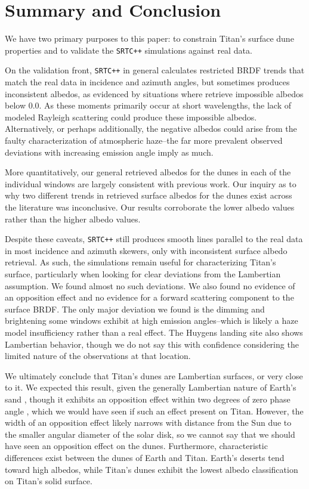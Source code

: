 \documentclass[twocolumn,linenumbers]{aastex631}
\def\srtcppspace{{\tt SRTC++} }
\begin{document}
\section{Summary and Conclusion} \label{sec:conclusion}

We have two primary purposes to this paper: to constrain Titan's surface dune properties and to validate the \srtcppspace simulations against real data.

On the validation front, \srtcppspace in general calculates restricted BRDF trends that match the real data in incidence and azimuth angles, but sometimes produces inconsistent albedos, as evidenced by situations where retrieve impossible albedos below 0.0. As these moments primarily occur at short wavelengths, the lack of modeled Rayleigh scattering could produce these impossible albedos. Alternatively, or perhaps additionally, the negative albedos could arise from the faulty characterization of atmospheric haze--the far more prevalent observed deviations with increasing emission angle imply as much.

More quantitatively, our general retrieved albedos for the dunes in each of the individual windows are largely consistent with previous work. Our inquiry as to why two different trends in retrieved surface albedos for the dunes exist across the literature was inconclusive. Our results corroborate the lower albedo values rather than the higher albedo values.

Despite these caveats, \srtcppspace still produces smooth lines parallel to the real data in most incidence and azimuth skewers, only with inconsistent surface albedo retrieval. As such, the simulations remain useful for characterizing Titan's surface, particularly when looking for clear deviations from the Lambertian assumption. We found almost no such deviations. We also found no evidence of an opposition effect and no evidence for a forward scattering component to the surface BRDF. The only major deviation we found is the dimming and brightening some windows exhibit at high emission angles--which is likely a haze model insufficiency rather than a real effect. The Huygens landing site also shows Lambertian behavior, though we do not say this with confidence considering the limited nature of the observations at that location.

We ultimately conclude that Titan's dunes are Lambertian surfaces, or very close to it. We expected this result, given the generally Lambertian nature of Earth's sand \citep{Hapke1963}, though it exhibits an opposition effect within two degrees of zero phase angle \citep{Wise2022}, which we would have seen if such an effect present on Titan. However, the width of an opposition effect likely narrows with distance from the Sun \citep{Karkoschka2012} due to the smaller angular diameter of the solar disk, so we cannot say that we should have seen an opposition effect on the dunes. Furthermore, characteristic differences exist between the dunes of Earth and Titan. Earth's deserts tend toward high albedos, while Titan's dunes exhibit the lowest albedo classification on Titan's solid surface.
\end{document}

